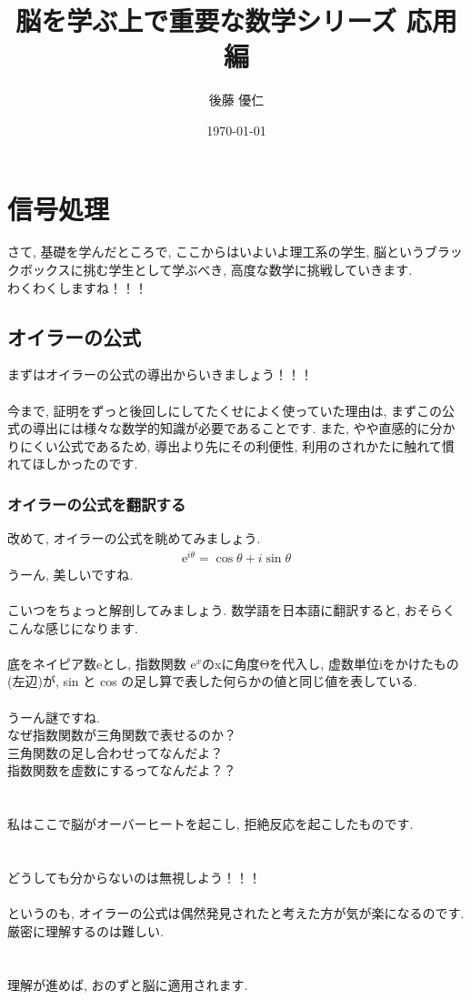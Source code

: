 \documentclass[11pt,a4paper,uplatex]{ujreport} 	%
\title{脳を学ぶ上で重要な数学シリーズ 応用編}
\author{後藤 優仁}
\date{\today}
\begin{document}
\maketitle
%
%
\tableofcontents


\chapter{信号処理}

さて, 基礎を学んだところで, ここからはいよいよ理工系の学生, 脳というブラックボックスに挑む学生として学ぶべき, 高度な数学に挑戦していきます.\\ 
わくわくしますね！！！\\
\section{オイラーの公式 \label{euler}}
まずはオイラーの公式の導出からいきましょう！！！\\
\\
今まで, 証明をずっと後回しにしてたくせによく使っていた理由は, まずこの公式の導出には様々な数学的知識が必要であることです. また, やや直感的に分かりにくい公式であるため, 導出より先にその利便性, 利用のされかたに触れて慣れてほしかったのです.\\

\subsection{オイラーの公式を翻訳する}
改めて, オイラーの公式を眺めてみましょう.\\
\begin{eqnarray}
\mathrm{e}^{i\theta} = \cos\theta + i\sin\theta
\end{eqnarray}
うーん, 美しいですね.\\
\\
こいつをちょっと解剖してみましょう. 数学語を日本語に翻訳すると, おそらくこんな感じになります.
\\
\\
底をネイピア数eとし, 指数関数 $\mathrm{e}^x$のxに角度Θを代入し, 虚数単位iをかけたもの(左辺)が, sin と cos の足し算で表した何らかの値と同じ値を表している.\\
\\
うーん謎ですね.\\
なぜ指数関数が三角関数で表せるのか？\\
三角関数の足し合わせってなんだよ？\\
指数関数を虚数にするってなんだよ？？\\
\\
\\
私はここで脳がオーバーヒートを起こし, 拒絶反応を起こしたものです.\\
\\
\\
どうしても分からないのは無視しよう！！！\\
\\
というのも, オイラーの公式は偶然発見されたと考えた方が気が楽になるのです. 厳密に理解するのは難しい.\\
\\
\\
理解が進めば, おのずと脳に適用されます.
\end{document}
